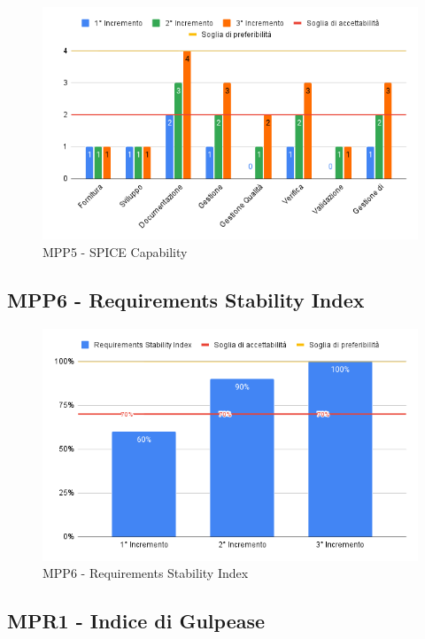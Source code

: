 \begin{figure}[H]
	\centering
	\includegraphics[scale = 0.6]{sezioni/Images/SPICECapability.png}
	\caption{MPP5 - SPICE Capability}
\end{figure}

\subsection{MPP6 - Requirements Stability Index}

\begin{figure}[H]
	\centering
	\includegraphics[scale = 0.6]{sezioni/Images/RequirementsStabilityIndex.png}
	\caption{MPP6 - Requirements Stability Index}
\end{figure}

\subsection{MPR1 - Indice di Gulpease}


